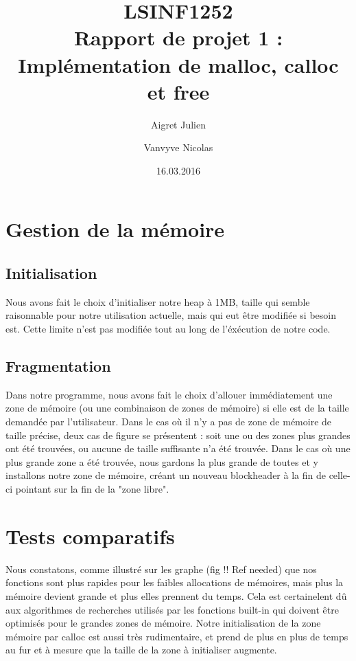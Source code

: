 \documentclass[10pt,a4paper]{article}
\author{Aigret Julien\and Vanvyve Nicolas}
\date{16.03.2016}
\title{LSINF1252\\Rapport de projet 1 :\\Implémentation de malloc, calloc et free}
\begin{document}
\maketitle

\section{Gestion de la mémoire}

\subsection{Initialisation}
Nous avons fait le choix d'initialiser notre heap à 1MB, taille qui semble raisonnable pour notre utilisation actuelle, mais qui eut être modifiée si besoin est. Cette limite n'est pas modifiée tout au long de l'éxécution de notre code.

\subsection{Fragmentation}
Dans notre programme, nous avons fait le choix d'allouer immédiatement une zone de mémoire (ou une combinaison de zones de mémoire) si elle est de la taille demandée par l'utilisateur. Dans le cas où il n'y a pas de zone de mémoire de taille précise, deux cas de figure se présentent : soit une ou des zones plus grandes ont été trouvées, ou aucune de taille suffisante n'a été trouvée. Dans le cas où une plus grande zone a été trouvée, nous gardons la plus grande de toutes et y installons notre zone de mémoire, créant un nouveau blockheader à la fin de celle-ci pointant sur la fin de la "zone libre".

\section{Tests comparatifs}

Nous constatons, comme illustré sur les graphe (fig !! Ref needed) que nos fonctions sont plus rapides pour les faibles allocations de mémoires, mais plus la mémoire devient grande et plus elles prennent du temps. Cela est certainelent dû aux algorithmes de recherches utilisés par les fonctions built-in qui doivent être optimisés pour le grandes zones de mémoire. Notre initialisation de la zone mémoire par calloc est aussi très rudimentaire, et prend de plus en plus de temps au fur et à mesure que la taille de la zone à initialiser augmente. 
\end{document}
